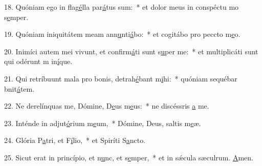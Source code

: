 18. Quóniam ego in flag\uline{é}lla par\uline{á}tus sum:~* et dolor meus in conspéctu mo s\uline{e}mper.\par 
19. Quóniam iniquitátem meam ann\uline{u}nti\uline{á}bo:~* et cogitábo pro peccto m\uline{e}o.\par 
20. Inimíci autem mei vivunt, et confirm\uline{á}ti sunt s\uline{u}per me:~* et multiplicáti sunt qui odérunt m in\uline{í}que.\par 
21. Qui retríbuunt mala pro bonis, detrah\uline{é}bant m\uline{i}hi:~* quóniam sequébar bnit\uline{á}tem.\par 
22. Ne derelínquas me, Dómine, D\uline{e}us m\uline{e}us:~* ne discéssris \uline{a} me.\par 
23. Inténde in adjut\uline{ó}rium m\uline{e}um,~* Dómine, Deus, saltis m\uline{e}æ.\par 
24. Glória P\uline{a}tri, et F\uline{í}lio,~* et Spiríti S\uline{a}ncto.\par 
25. Sicut erat in princípio, et n\uline{u}nc, et s\uline{e}mper,~* et in sǽcula sæculrum. \uline{A}men.\par 
